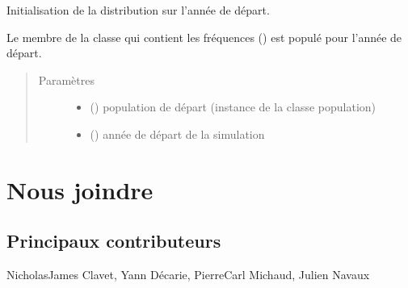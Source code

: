\documentclass[letterpaper,10pt,french]{sphinxmanual}
\begin{document}
\begin{fulllineitems}
\begin{fulllineitems}
\begin{quote}
\begin{description}
\end{description}\end{quote}

\end{fulllineitems}


\begin{fulllineitems}
\label{\detokenize{code:simgen.statistics.start}}
Initialisation de la distribution sur l’année de départ.

Le membre de la classe qui contient les fréquences () est populé pour l’année de départ.
\begin{quote}\begin{description}
\item[{Paramètres}] \leavevmode\begin{itemize}
\item {} 
 ({\hyperref[\detokenize{code:simgen.population}]{}}) \textendash{} population de départ (instance de la classe population)

\item {} 
 () \textendash{} année de départ de la simulation

\end{itemize}

\end{description}\end{quote}

\end{fulllineitems}


\end{fulllineitems}



\section{Nous joindre}
\label{\detokenize{credits:nous-joindre}}\label{\detokenize{credits::doc}}

\subsection{Principaux contributeurs}
\label{\detokenize{credits:principaux-contributeurs}}
Nicholas\sphinxhyphen{}James Clavet, Yann Décarie, Pierre\sphinxhyphen{}Carl Michaud, Julien Navaux
\end{document}
